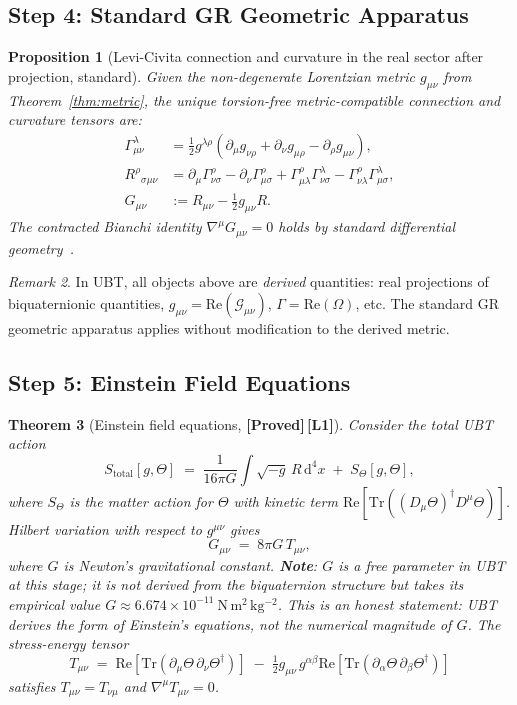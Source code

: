\documentclass[12pt,a4paper]{article}
\newtheorem{theorem}{Theorem}[section]
\newtheorem{proposition}[theorem]{Proposition}
\theoremstyle{definition}
\theoremstyle{remark}
\newtheorem{remark}[theorem]{Remark}
\newcommand{\PROVED}{\textbf{[Proved]}}
\newcommand{\Lone}{\textbf{[L1]}}
\newcommand{\Tr}{\mathrm{Tr}}
\newcommand{\re}{\mathrm{Re}}
\newcommand{\calG}{\mathcal{G}}
\begin{document}
\subsection{Step 4: Standard GR Geometric Apparatus}
\label{sec:step4}

\begin{proposition}[Levi-Civita connection and curvature in the real sector after projection, standard]
\label{prop:geometry}
Given the non-degenerate Lorentzian metric $g_{\mu\nu}$ from
Theorem~\ref{thm:metric}, the unique torsion-free metric-compatible connection
and curvature tensors are:
\begin{align}
  \Gamma^\lambda_{\mu\nu}
    &= \tfrac{1}{2}g^{\lambda\rho}
       (\partial_\mu g_{\nu\rho} + \partial_\nu g_{\mu\rho}
        - \partial_\rho g_{\mu\nu}), \\
  R^\rho{}_{\sigma\mu\nu}
    &= \partial_\mu\Gamma^\rho_{\nu\sigma}
       - \partial_\nu\Gamma^\rho_{\mu\sigma}
       + \Gamma^\rho_{\mu\lambda}\Gamma^\lambda_{\nu\sigma}
       - \Gamma^\rho_{\nu\lambda}\Gamma^\lambda_{\mu\sigma}, \\
  G_{\mu\nu}
    &:= R_{\mu\nu} - \tfrac{1}{2}g_{\mu\nu}R.
\end{align}
The contracted Bianchi identity $\nabla^\mu G_{\mu\nu} = 0$ holds by standard
differential geometry~\cite{wald1984,mtw1973}.
\end{proposition}

\begin{remark}
In UBT, all objects above are \emph{derived} quantities: real projections of
biquaternionic quantities,
$g_{\mu\nu} = \re(\calG_{\mu\nu})$,
$\Gamma = \re(\Omega)$, etc.
The standard GR geometric apparatus applies without modification to the
derived metric.
\end{remark}

\subsection{Step 5: Einstein Field Equations}
\label{sec:step5}

\begin{theorem}[Einstein field equations, \PROVED\,\Lone]
\label{thm:einstein}
Consider the total UBT action
\[
  S_{\mathrm{total}}[g,\Theta]
  \;=\; \frac{1}{16\pi G}\int\!\!\sqrt{-g}\,R\,\mathrm{d}^4x
  \;+\; S_\Theta[g,\Theta],
\]
where $S_\Theta$ is the matter action for $\Theta$ with kinetic term
$\re[\Tr((D_\mu\Theta)^\dagger D^\mu\Theta)]$.
Hilbert variation with respect to $g^{\mu\nu}$ gives
\[
  G_{\mu\nu} \;=\; 8\pi G\,T_{\mu\nu},
\]
where $G$ is Newton's gravitational constant.
\textbf{Note}: $G$ is a free parameter in UBT at this stage; it is not
derived from the biquaternion structure but takes its empirical value
$G \approx 6.674 \times 10^{-11}\ \mathrm{N\,m^2\,kg^{-2}}$.
This is an honest statement: UBT derives the \emph{form} of Einstein's
equations, not the numerical magnitude of $G$.
The stress-energy tensor
\[
  T_{\mu\nu}
  \;=\; \re[\Tr(\partial_\mu\Theta\,\partial_\nu\Theta^\dagger)]
  \;-\; \tfrac{1}{2}g_{\mu\nu}\,g^{\alpha\beta}
        \re[\Tr(\partial_\alpha\Theta\,\partial_\beta\Theta^\dagger)]
\]
satisfies $T_{\mu\nu} = T_{\nu\mu}$ and $\nabla^\mu T_{\mu\nu} = 0$.
\end{theorem}
\end{document}
